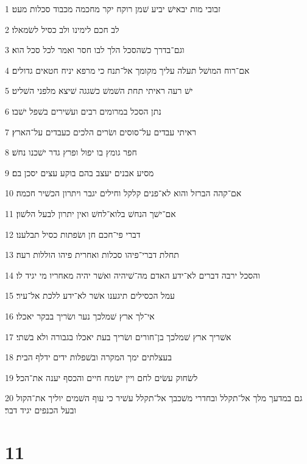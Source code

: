 \par 1 זבובי מות יבאישׁ יביע שׁמן רוקח יקר מחכמה מכבוד סכלות מעט׃
\par 2 לב חכם לימינו ולב כסיל לשׂמאלו׃
\par 3 וגם־בדרך כשׁהסכל הלך לבו חסר ואמר לכל סכל הוא׃
\par 4 אם־רוח המושׁל תעלה עליך מקומך אל־תנח כי מרפא יניח חטאים גדולים׃
\par 5 ישׁ רעה ראיתי תחת השׁמשׁ כשׁגגה שׁיצא מלפני השׁליט׃
\par 6 נתן הסכל במרומים רבים ועשׁירים בשׁפל ישׁבו׃
\par 7 ראיתי עבדים על־סוסים ושׂרים הלכים כעבדים על־הארץ׃
\par 8 חפר גומץ בו יפול ופרץ גדר ישׁכנו נחשׁ׃
\par 9 מסיע אבנים יעצב בהם בוקע עצים יסכן בם׃
\par 10 אם־קהה הברזל והוא לא־פנים קלקל וחילים יגבר ויתרון הכשׁיר חכמה׃
\par 11 אם־ישׁך הנחשׁ בלוא־לחשׁ ואין יתרון לבעל הלשׁון׃
\par 12 דברי פי־חכם חן ושׂפתות כסיל תבלענו׃
\par 13 תחלת דברי־פיהו סכלות ואחרית פיהו הוללות רעה׃
\par 14 והסכל ירבה דברים לא־ידע האדם מה־שׁיהיה ואשׁר יהיה מאחריו מי יגיד לו׃
\par 15 עמל הכסילים תיגענו אשׁר לא־ידע ללכת אל־עיר׃
\par 16 אי־לך ארץ שׁמלכך נער ושׂריך בבקר יאכלו׃
\par 17 אשׁריך ארץ שׁמלכך בן־חורים ושׂריך בעת יאכלו בגבורה ולא בשׁתי׃
\par 18 בעצלתים ימך המקרה ובשׁפלות ידים ידלף הבית׃
\par 19 לשׂחוק עשׂים לחם ויין ישׂמח חיים והכסף יענה את־הכל׃
\par 20 גם במדעך מלך אל־תקלל ובחדרי משׁכבך אל־תקלל עשׁיר כי עוף השׁמים יוליך את־הקול ובעל הכנפים יגיד דבר׃

\chapter{11}

